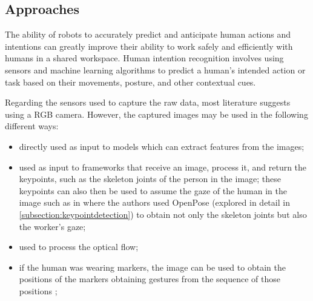 \subsection{Approaches}

The ability of robots to accurately predict and anticipate human actions and intentions can greatly improve their ability to work safely and efficiently with humans in a shared workspace. Human intention recognition involves using sensors and machine learning algorithms to predict a human's intended action or task based on their movements, posture, and other contextual cues.


Regarding the sensors used to capture the raw data, most literature suggests using a RGB camera. However, the captured images may be used in the following different ways:
\begin{itemize}
\item directly used as input to models which can extract features from the images;

\item used as input to frameworks that receive an image, process it, and return the keypoints, such as the skeleton joints of the person in the image; these keypoints can also then be used to assume the gaze of the human in the image such as in \textcite{Canuto2021} where the authors used OpenPose (explored in detail in \autoref{subsection:keypointdetection}) to obtain not only the skeleton joints but also the worker's gaze;

\item used to process the optical flow\cite{Gammulle2019, Wu2021, Rodriguez2019, Furnari2021};

\item if the human was wearing markers, the image can be used to obtain the positions of the markers obtaining gestures from the sequence of those positions \cite{Maeda2016};
\end{itemize}

